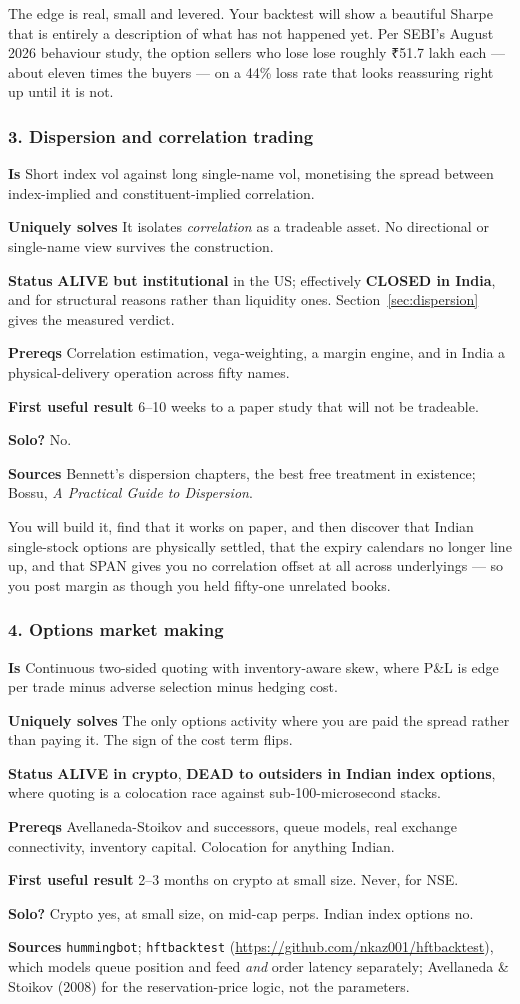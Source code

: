 \documentclass[11pt,a4paper]{article}
\newcommand{\alv}[1]{\textcolor{alive}{\textbf{#1}}}
\newcommand{\dec}[1]{\textcolor{decayed}{\textbf{#1}}}
\newcommand{\fitem}[1]{\par\smallskip\noindent\textbf{#1} }
\newcommand{\rs}{₹}
\begin{document}
\begin{waste}
The edge is real, small and levered. Your backtest will show a beautiful Sharpe
that is entirely a description of what has not happened yet. Per SEBI's August
2026 behaviour study, the option sellers who lose lose roughly \rs 51.7 lakh
each --- about eleven times the buyers --- on a 44\% loss rate that looks
reassuring right up until it is not.
\end{waste}

\subsubsection{3. Dispersion and correlation trading}
\fitem{Is}Short index vol against long single-name vol, monetising the spread
between index-implied and constituent-implied correlation.
\fitem{Uniquely solves}It isolates \emph{correlation} as a tradeable asset. No
directional or single-name view survives the construction.
\fitem{Status}\alv{ALIVE but institutional} in the US; effectively
\dec{CLOSED in India}, and for structural reasons rather than liquidity ones.
Section~\ref{sec:dispersion} gives the measured verdict.
\fitem{Prereqs}Correlation estimation, vega-weighting, a margin engine, and in
India a physical-delivery operation across fifty names.
\fitem{First useful result}6--10 weeks to a paper study that will not be tradeable.
\fitem{Solo?}No.
\fitem{Sources}Bennett's dispersion chapters, the best free treatment in
existence; Bossu, \emph{A Practical Guide to Dispersion}.

\begin{waste}
You will build it, find that it works on paper, and then discover that Indian
single-stock options are physically settled, that the expiry calendars no longer
line up, and that SPAN gives you no correlation offset at all across
underlyings --- so you post margin as though you held fifty-one unrelated books.
\end{waste}

\subsubsection{4. Options market making}
\fitem{Is}Continuous two-sided quoting with inventory-aware skew, where P\&L is
edge per trade minus adverse selection minus hedging cost.
\fitem{Uniquely solves}The only options activity where you are paid the spread
rather than paying it. The sign of the cost term flips.
\fitem{Status}\alv{ALIVE in crypto}, \dec{DEAD to outsiders in Indian index
options}, where quoting is a colocation race against sub-100-microsecond stacks.
\fitem{Prereqs}Avellaneda-Stoikov and successors, queue models, real exchange
connectivity, inventory capital. Colocation for anything Indian.
\fitem{First useful result}2--3 months on crypto at small size. Never, for NSE.
\fitem{Solo?}Crypto yes, at small size, on mid-cap perps. Indian index options no.
\fitem{Sources}\texttt{hummingbot}; \texttt{hftbacktest}
(\url{https://github.com/nkaz001/hftbacktest}), which models queue position and
feed \emph{and} order latency separately; Avellaneda \& Stoikov (2008) for the
reservation-price logic, not the parameters.
\end{document}
